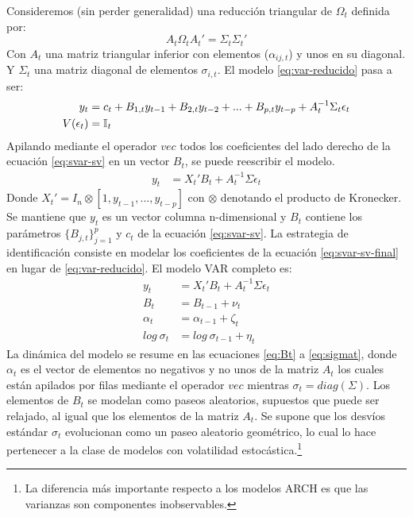 \documentclass[12pt,oneside]{reedthesis}
\begin{document}
Consideremos (sin perder generalidad) una reducción triangular de \(\Omega_t\) definida por:
\begin{equation}
A_t\Omega_tA_t' = \Sigma_t\Sigma_t'
\end{equation}
Con \(A_t\) una matriz triangular inferior con elementos (\(\alpha_{ij,t}\)) y unos en su diagonal. Y \(\Sigma_t\) una matriz diagonal de elementos \(\sigma_{i, t}\). El modelo \eqref{eq:var-reducido} pasa a ser:
\begin{align}
y_t &= c_t + B_{1,t}y_{t-1} + B_{2,t}y_{t-2} + ... + B_{p,t}y_{t-p} + A_t^{-1}\Sigma_t\epsilon_t \label{eq:svar-sv} \\
V(\epsilon_t) &= \mathbb{I}_t \notag
\end{align}
Apilando mediante el operador \(vec\) todos los coeficientes del lado derecho de la ecuación \eqref{eq:svar-sv} en un vector \(B_t\), se puede reescribir el modelo.
\begin{align}
y_t  &= X_t'B_t + A_t^{-1}\Sigma \epsilon_t \label{eq:svar-sv-final}
\end{align}
Donde \(X_t' = I_n \otimes [1, y_{t-1}, ..., y_{t-p}]\) con \(\otimes\) denotando el producto de Kronecker. Se mantiene que \(y_t\) es un vector columna n-dimensional y \(B_t\) contiene los parámetros \(\{B_{j,t}\}_{j=1}^p\) y \(c_t\) de la ecuación \eqref{eq:svar-sv}.
La estrategia de identificación consiste en modelar los coeficientes de la ecuación \eqref{eq:svar-sv-final} en lugar de \eqref{eq:var-reducido}. El modelo VAR completo es:
\begin{align}
y_t  &= X_t'B_t + A_t^{-1}\Sigma\epsilon_t \label{eq:yt}\\
B_t &= B_{t-1} + \nu_t \label{eq:Bt}\\
\alpha_t &= \alpha_{t-1} + \zeta_t \label{eq:alphat}\\
log \ \sigma_t &= log \ \sigma_{t-1} + \eta_t \label{eq:sigmat}
\end{align}
La dinámica del modelo se resume en las ecuaciones \eqref{eq:Bt} a \eqref{eq:sigmat}, donde \(\alpha_t\) es el vector de elementos no negativos y no unos de la matriz \(A_t\) los cuales están apilados por filas mediante el operador \(vec\) mientras \(\sigma_t = diag(\Sigma)\). Los elementos de \(B_t\) se modelan como paseos aleatorios, supuestos que puede ser relajado, al igual que los elementos de la matriz \(A_t\). Se supone que los desvíos estándar \(\sigma_t\) evolucionan como un paseo aleatorio geométrico, lo cual lo hace pertenecer a la clase de modelos con volatilidad estocástica.\footnote{La diferencia más importante respecto a los modelos ARCH es que las varianzas son componentes inobservables.}
\end{document}
